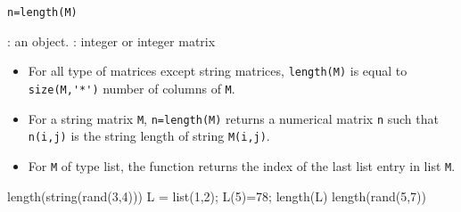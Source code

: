 
\begin{mandesc}
\end{mandesc}
\begin{calling_sequence}
\begin{verbatim}
n=length(M)   
\end{verbatim}
\end{calling_sequence}

\begin{parameters}
  \begin{varlist}
     : an object.
     : integer or integer matrix
  \end{varlist}
\end{parameters}

\begin{mandescription}
\begin{itemize}
  \item  For all type of matrices  except string matrices, \verb!length(M)! is equal to \verb!size(M,'*')!  number of columns of \verb!M!.
  \item For a string matrix \verb+M+, \verb+n=length(M)+ returns a numerical matrix \verb+n+ such that 
    \verb+n(i,j)+ is the string length of string \verb+M(i,j)+.
  \item For \verb+M+ of type list, the function returns the index of the last list entry in list \verb+M+.
\end{itemize}
\end{mandescription}

\begin{examples}
  \begin{program}
    length(string(rand(3,4)))
    L = list(1,2); L(5)=78; length(L)
    length(rand(5,7))
  \end{program}
\end{examples}

\begin{manseealso}
\end{manseealso}

